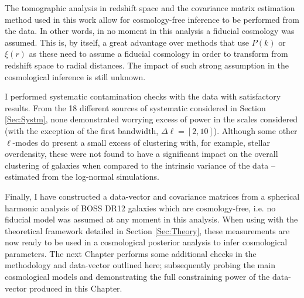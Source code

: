 \qquad The tomographic analysis in redshift space and the covariance matrix estimation method used in this work allow for cosmology-free inference to be performed from the data. In other words, in no moment in this analysis a fiducial cosmology was assumed. This is, by itself, a great advantage over methods that use $P(k)$ or $\xi(r)$ as these need to assume a fiducial cosmology in order to transform from redshift space to radial distances. The impact of such strong assumption in the cosmological inference is still unknown.

\qquad I performed systematic contamination checks with the data with satisfactory results. From the 18 different sources of systematic considered in Section \ref{Sec:Systm}, none demonstrated worrying excess of power in the scales considered (with the exception of the first bandwidth, $\Delta \ell = [2,10]$). Although some other $\ell$-modes do present a small excess of clustering with, for example, stellar overdensity, these were not found to have a significant impact on the overall clustering of galaxies when compared to the intrinsic variance of the data -- estimated from the log-normal simulations.

\qquad Finally, I have constructed a data-vector and covariance matrices from a spherical harmonic analysis of BOSS DR12 galaxies which are cosmology-free, i.e. no fiducial model was assumed at any moment in this analysis. When using with the theoretical framework detailed in Section \ref{Sec:Theory}, these measurements are now ready to be used in a cosmological posterior analysis to infer cosmological parameters. The next Chapter performs some additional checks in the methodology and data-vector outlined here; subsequently probing the main cosmological models and demonstrating the full constraining power of the data-vector produced in this Chapter.
